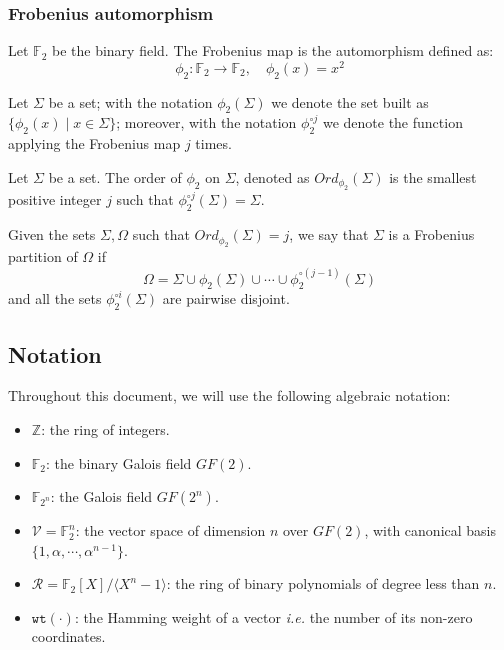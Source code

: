 \subsubsection{Frobenius automorphism}
    \begin{definition}
    Let $\mathds{F}_2$ be the binary field. The Frobenius map is the automorphism defined as:
    \begin{equation}
        \phi_2 : \mathds{F}_2 \rightarrow \mathds{F}_2, \quad \phi_2(x) = x^2
    \end{equation}
    \end{definition}
    Let $\Sigma$ be a set; with the notation $\phi_2(\Sigma)$ we denote the set built as $\{\phi_2(x) \mid x \in \Sigma\}$;
    moreover, with the notation $\phi_2^{\circ j}$ we denote the function applying the Frobenius map $j$ times.

    \begin{definition}
        Let $\Sigma$ be a set. The order of $\phi_2$ on $\Sigma$, denoted as $Ord_{\phi_2}(\Sigma)$ is the smallest positive integer $j$ such that $\phi_2^{\circ j}(\Sigma) = \Sigma$.
    \end{definition}

    \begin{definition}
        Given the sets $\Sigma, \Omega$ such that $Ord_{\phi_2}(\Sigma)=j$, we say that $\Sigma$ is a Frobenius partition
        of $\Omega$ if
        \begin{equation}
            \Omega = \Sigma \cup \phi_2(\Sigma) \cup \cdots \cup \phi_2^{\circ (j-1)}(\Sigma)
        \end{equation}
        and all the sets $\phi_2^{\circ i}(\Sigma)$ are pairwise disjoint.
    \end{definition}

\subsection{Notation}
Throughout this document, we will use the following algebraic notation:
\begin{itemize}
    \item $\mathds{Z}$: the ring of integers.
    \item $\mathds{F}_2$: the binary Galois field $GF(2)$.
    \item $\mathds{F}_{2^n}$: the Galois field $GF(2^n)$.
    \item $\mathcal{V} = \mathds{F}_2^n$: the vector space of dimension $n$ over $GF(2)$, with canonical basis $\{1, \alpha, \cdots, \alpha^{n-1}\}$.
    \item $\mathcal{R} = \mathds{F}_2[X]/\langle X^n-1\rangle$: the ring of binary polynomials of degree less than $n$.
    \item $\texttt{wt}(\cdot)$: the Hamming weight of a vector \textit{i.e.} the number of its non-zero coordinates.
\end{itemize}